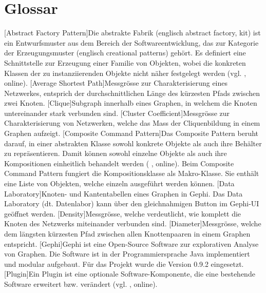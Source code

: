 \chapter*{Glossar}

\begin{acronym}
    [Abstract Factory Pattern]{Die abstrakte Fabrik (englisch abstract factory, kit) ist ein Entwurfsmuster aus dem Bereich der Softwareentwicklung, das zur Kategorie der Erzeugungsmuster (englisch creational patterns) gehört. Es definiert eine Schnittstelle zur Erzeugung einer Familie von Objekten, wobei die konkreten Klassen der zu instanziierenden Objekte nicht näher festgelegt werden (vgl. \citeauthor{wikipedia_abstrakte_2018} \citeyear{wikipedia_abstrakte_2018}, online).}
    [Average Shortest Path]{Messgrösse zur Charakterisierung eines Netzwerkes, entsprich der durchschnittlichen Länge des kürzesten Pfads zwischen zwei Knoten.}
    [Clique]{Subgraph innerhalb eines Graphen, in welchem die Knoten untereinander stark verbunden sind.}
    [Cluster Coefficient]{Messgrösse zur Charakterisierung von Netzwerken, welche das Mass der Cliquenbildung in einem Graphen aufzeigt.}
    [Composite Command Pattern]{Das Composite Pattern beruht darauf, in einer abstrakten Klasse sowohl konkrete Objekte als auch ihre Behälter zu repräsentieren. Damit können sowohl einzelne Objekte als auch ihre Kompositionen einheitlich behandelt werden (\citeauthor{wikipedia_kompositum_2019} \citeyear{wikipedia_kompositum_2019}, online). Beim Composite Command Pattern fungiert die Kompositionsklasse als Makro-Klasse. Sie enthält eine Liste von Objekten, welche einzeln ausgeführt werden können.}
    [Data Laboratory]{Knoten- und Kantentabellen eines Graphen in Gephi. Das Data Laboratory (dt. Datenlabor) kann über den gleichnahmigen Button im Gephi-UI geöffnet werden.}
    [Density]{Messgrösse, welche verdeutlicht, wie komplett die Knoten des Netzwerks miteinander verbunden sind.}
    [Diameter]{Messgrösse, welche dem längsten kürzesten Pfad zwischen allen Knottenpaaren in einem Graphen entspricht.}
    [Gephi]{Gephi ist eine Open-Source Software zur explorativen
    Analyse von Graphen. Die Software ist in der Programmiersprache Java implementiert
    und modular aufgebaut. Für das Projekt wurde die Version 0.9.2 eingesetzt.}
    [Plugin]{Ein Plugin ist eine optionale Software-Komponente, die eine bestehende Software erweitert bzw. verändert (vgl. \citeauthor{wikipedia_plug-_2019} \citeyear{wikipedia_plug-_2019}, online).}

\end{acronym}
